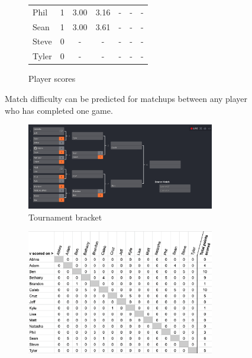 \documentclass[letterpaper, 10 pt, conference]{ieeeconf}  %
\begin{document}
\begin{figure}[h!b]
\begin{subfigure}[hb]{0.4\textwidth}
\begin{tabular}{lccc|ccc}
                        Phil	& 1	& 3.00	& 3.16 & - & - & - \\
                        Sean	& 1	& 3.00	& 3.61 & - & - & - \\
                        Steve	& 0	& -  	& -    & - & - & - \\
                        Tyler	& 0	& -  	& -    & - & - & - \\
                        \bottomrule
                \end{tabular}
                \caption{Player scores}
        \end{subfigure}
        \caption{Match difficulty can be predicted for matchups between 
                 any player who has completed one game.}
\end{figure}

\begin{figure}[h!b]
        \centering
        \begin{subfigure}[ht]{0.5\textwidth}
                \centering
                \includegraphics[width=0.9\textwidth]{fig/singles-bracket_3.png}
                \caption{Tournament bracket}
        \end{subfigure}
        \begin{subfigure}[ht]{0.4\textwidth}
                \centering
                \includegraphics[width=0.9\textwidth]{fig/score-matrix_3.png}

\end{subfigure}
\end{figure}
\end{document}
